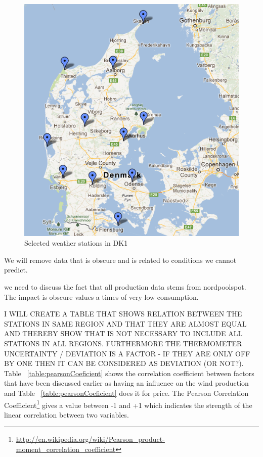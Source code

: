 \begin{figure}[H]
\centering
\includegraphics[width=0.85\linewidth,natwidth=898,natheight=587]{billeder/stations4average.png}
\caption{Selected weather stations in DK1}
\label{fig:stations4average}
\end{figure}

We will remove data that is obscure and is related to conditions we cannot predict. 

we need to discuss the fact that all production data stems from nordpoolspot. The impact is obscure values a times of very low consumption.

I WILL CREATE A TABLE THAT SHOWS RELATION BETWEEN THE STATIONS IN SAME REGION AND THAT THEY ARE ALMOST EQUAL AND THEREBY SHOW THAT IS NOT NECESSARY TO INCLUDE ALL STATIONS IN ALL REGIONS. FURTHERMORE THE THERMOMETER UNCERTAINTY / DEVIATION IS A FACTOR - IF THEY ARE ONLY OFF BY ONE THEN IT CAN BE CONSIDERED AS DEVIATION (OR NOT?).
\\[0.5cm]
Table ~\ref{table:pearsonCoeficient} shows the correlation coefficient between factors that have been discussed earlier as having an influence on the wind production and Table ~\ref{table:pearsonCoeficient} does it for price. The Pearson Correlation Coefficient\footnote{\url{http://en.wikipedia.org/wiki/Pearson_product-moment_correlation_coefficient}} gives a value between -1 and +1 which indicates the strength of the linear correlation between two variables.

